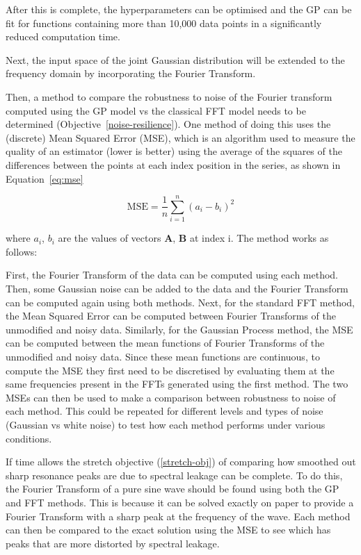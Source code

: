 \documentclass[12pt]{article}
\begin{document}
    After this is complete, the hyperparameters can be optimised and the GP can be fit for functions containing more than 10,000 data points in a significantly reduced computation time.

    Next, the input space of the joint Gaussian distribution will be extended to the frequency domain by incorporating the Fourier Transform.

    Then, a method to compare the robustness to noise of the Fourier transform computed using the GP model vs the classical FFT model needs to be determined (Objective~\ref{noise-resilience}).
    One method of doing this uses the (discrete) Mean Squared Error (MSE), which is an algorithm used to measure the quality of an estimator (lower is better) using the average of the squares of the differences between the points at each index position in the series, as shown in Equation~\ref{eq:mse}

    \begin{equation}
        \text{MSE} = \frac{1}{n} \sum_{i=1}^{n} (a_i - b_i)^2
        \label{eq:mse}
    \end{equation}

    \noindent where $a_i$, $b_i$ are the values of vectors $\mathbf{A}$, $\mathbf{B}$ at index i.
    The method works as follows:

    First, the Fourier Transform of the data can be computed using each method.
    Then, some Gaussian noise can be added to the data and the Fourier Transform can be computed again using both methods.
    Next, for the standard FFT method, the Mean Squared Error can be computed between Fourier Transforms of the unmodified and noisy data.
    Similarly, for the Gaussian Process method, the MSE can be computed between the mean functions of Fourier Transforms of the unmodified and noisy data.
    Since these mean functions are continuous, to compute the MSE they first need to be discretised by evaluating them at the same frequencies present in the FFTs generated using the first method.
    The two MSEs can then be used to make a comparison between robustness to noise of each method.
    This could be repeated for different levels and types of noise (Gaussian vs white noise) to test how each method performs under various conditions.

    If time allows the stretch objective (\ref{stretch-obj}) of comparing how smoothed out sharp resonance peaks are due to spectral leakage can be complete.
    To do this, the Fourier Transform of a pure sine wave should be found using both the GP and FFT methods.
    This is because it can be solved exactly on paper to provide a Fourier Transform with a sharp peak at the frequency of the wave.
    Each method can then be compared to the exact solution using the MSE to see which has peaks that are more distorted by spectral leakage.
\end{document}
